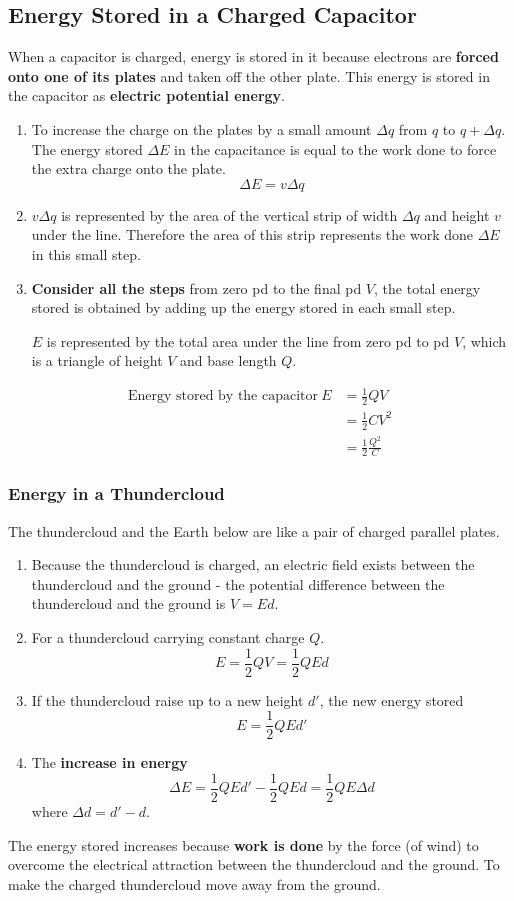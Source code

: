 \subsection{Energy Stored in a Charged Capacitor}
When a capacitor is charged, energy is stored in it because electrons are \textbf{forced onto one of its plates} and taken off the other plate. This energy is stored in the capacitor as \textbf{electric potential energy}.

\begin{enumerate}
    \item To increase the charge on the plates by a small amount $\Delta q$ from $q$ to $q+\Delta q$. The energy stored $\Delta E$ in the capacitance is equal to the work done to force the extra charge onto the plate.
        $$\Delta E=v\Delta q$$
    \item $v\Delta q$ is represented by the area of the vertical strip of width $\Delta q$ and height $v$ under the line. Therefore the area of this strip represents the work done $\Delta E$ in this small step.
    \item \textbf{Consider all the steps} from zero pd to the final pd $V$, the total energy stored is obtained by adding up the energy stored in each small step.

        $E$ is represented by the total area under the line from zero pd to pd $V$, which is a triangle of height $V$ and base length $Q$.
\end{enumerate}
\begin{align*}
    \text{Energy stored by the capacitor}\ E&=\frac{1}{2}QV\\
                                            &=\frac{1}{2}CV^2\\
                                            &=\frac{1}{2}\frac{Q^2}{C}
\end{align*}

\subsubsection*{Energy in a Thundercloud}

The thundercloud and the Earth below are like a pair of charged parallel plates.
\begin{enumerate}
    \item Because the thundercloud is charged, an electric field exists between the thundercloud and the ground - the potential difference between the thundercloud and the ground is $V=Ed$.
    \item For a thundercloud carrying constant charge $Q$.
        $$E=\frac{1}{2}QV=\frac{1}{2}QEd$$
    \item If the thundercloud raise up to a new height $d'$, the new energy stored
        $$E=\frac{1}{2}QEd'$$
    \item The \textbf{increase in energy}
        $$\Delta E=\frac{1}{2}QEd'-\frac{1}{2}QEd=\frac{1}{2}QE\Delta d$$
        where $\Delta d=d'-d$.
\end{enumerate}

The energy stored increases because \textbf{work is done} by the force (of wind) to overcome the electrical attraction between the thundercloud and the ground. To make the charged thundercloud move away from the ground.
